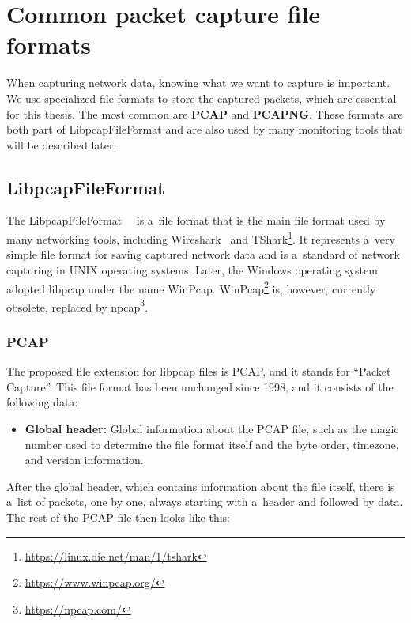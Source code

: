 \documentclass[
  printed,     %
  color,       %
  oneside,     %
  nosansbold,  %
  nocolorbold, %
  nolof,         %
  nolot,         %
]{fithesis4}
\begin{document}
\section{Common packet capture file formats}

When capturing network data, knowing what we want to capture is important. We use specialized file formats to store the captured packets, which are essential for this thesis. The most common are \textbf{PCAP} and \textbf{PCAPNG}. These formats are both part of LibpcapFileFormat and are also used by many monitoring tools that will be described later.

\subsection{LibpcapFileFormat}

The LibpcapFileFormat~\cite{LibpcapF59:online}~\cite{LibpcapF97:online} is a~file format that is the main file format used by many networking tools, including Wireshark~\cite{Wireshar89:online} and TShark\footnote{\url{https://linux.die.net/man/1/tshark}}. It represents a~very simple file format for saving captured network data and is a~standard of network capturing in UNIX operating systems. Later, the Windows operating system adopted libpcap under the name WinPcap. WinPcap\footnote{\url{https://www.winpcap.org/}} is, however, currently obsolete, replaced by npcap\footnote{\url{https://npcap.com/}}.

\subsubsection{PCAP}

The proposed file extension for libpcap files is PCAP, and it stands for \enquote{Packet Capture}. This file format has been unchanged since 1998, and it consists of the following data:

\begin{itemize}
    \item \textbf{Global header:} Global information about the PCAP file, such as the magic number used to determine the file format itself and the byte order, timezone, and version information.
\end{itemize}

After the global header, which contains information about the file itself, there is a~list of packets, one by one, always starting with a~header and followed by data. The rest of the PCAP file then looks like this:
\end{document}
